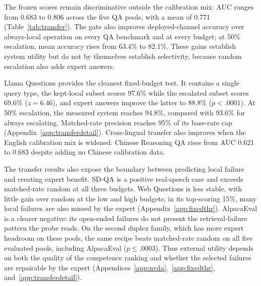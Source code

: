 The frozen scores remain discriminative outside the calibration mix:
AUC ranges from 0.683 to 0.806 across the five QA pools, with a mean of
0.771 (Table~\ref{tab:transfer}). The gate also improves
deployed-channel accuracy over always-local operation on every QA
benchmark and at every budget; at 50\% escalation, mean accuracy rises
from 63.4\% to 82.1\%. These gains establish system utility but do not
by themselves establish selectivity, because random escalation also
adds expert answers.

Llama Questions provides the cleanest fixed-budget test. It contains a
single query type, the kept-local subset scores 97.6\% while the
escalated subset scores 69.6\% ($z{=}6.46$), and expert answers improve
the latter to 88.8\% ($p{<}.0001$). At 50\% escalation, the measured
system reaches 94.8\%, compared with 93.6\% for always escalating.
Matched-rate precision reaches 95\% of its base-rate cap
(Appendix~\ref{app:transferdetail}). Cross-lingual transfer also
improves when the English calibration mix is widened: Chinese
Reasoning QA rises from AUC 0.621 to 0.683 despite adding no Chinese
calibration data.

The transfer results also expose the boundary between predicting local
failure and creating expert benefit. SD-QA is a positive real-speech
case and exceeds matched-rate random at all three budgets. Web
Questions is less stable, with little gain over random at the low and
high budgets; in its top-scoring 15\%, many local failures are also
missed by the expert
(Appendix~\ref{app:fixedthr}). AlpacaEval is a clearer negative: its
open-ended failures do not present the retrieval-failure pattern the
probe reads. On the second duplex family, which has more expert
headroom on these pools, the same recipe beats matched-rate random on
all five evaluated pools, including AlpacaEval ($p\le.0003$). Thus
external utility depends on both the quality of the competence ranking
and whether the selected failures are repairable by the expert
(Appendices~\ref{app:nvda},~\ref{app:fixedthr},
and~\ref{app:transferdetail}).
